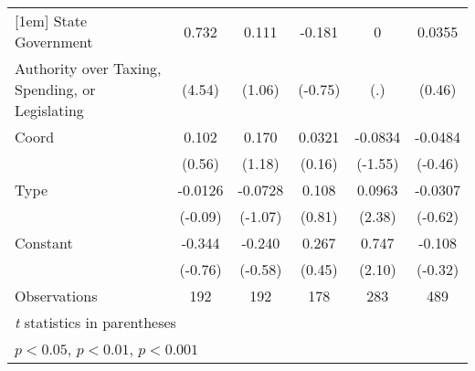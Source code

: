 {\begin{tabular}{l*{5}{c}}
[1em]
State Government    &       0.732\sym{***}&       0.111         &      -0.181         &           0         &      0.0355         \\
Authority over Taxing, Spending, or Legislating&      (4.54)         &      (1.06)         &     (-0.75)         &         (.)         &      (0.46)         \\
[1em]
Coord               &       0.102         &       0.170         &      0.0321         &     -0.0834         &     -0.0484         \\
                    &      (0.56)         &      (1.18)         &      (0.16)         &     (-1.55)         &     (-0.46)         \\
[1em]
Type                &     -0.0126         &     -0.0728         &       0.108         &      0.0963\sym{*}  &     -0.0307         \\
                    &     (-0.09)         &     (-1.07)         &      (0.81)         &      (2.38)         &     (-0.62)         \\
[1em]
Constant            &      -0.344         &      -0.240         &       0.267         &       0.747\sym{*}  &      -0.108         \\
                    &     (-0.76)         &     (-0.58)         &      (0.45)         &      (2.10)         &     (-0.32)         \\
\hline
Observations        &         192         &         192         &         178         &         283         &         489         \\
\hline\hline
\multicolumn{6}{l}{\footnotesize \textit{t} statistics in parentheses}\\
\multicolumn{6}{l}{\footnotesize \sym{*} \(p<0.05\), \sym{**} \(p<0.01\), \sym{***} \(p<0.001\)}\\
\end{tabular}
}
